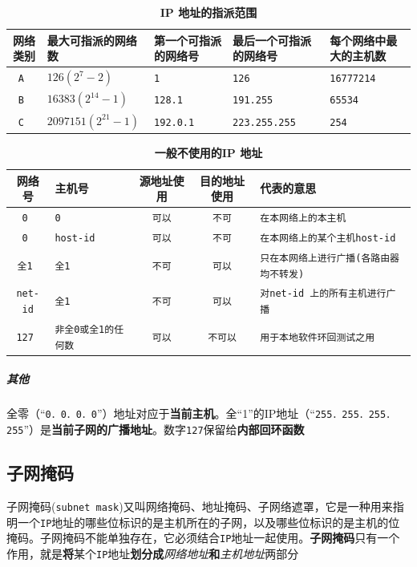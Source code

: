 \documentclass[UTF8,a4paper,8pt]{ctexbook}
\begin{document}
					\begin{table}[H]
						\centering
						\caption{\textbf{IP 地址的指派范围}}
						\begin{tabular}{|c|m{3cm}|m{3cm}|m{3cm}|m{3cm}|}
							\hline 
							网络类别 & 最大可指派的网络数 & 第一个可指派的网络号 & 最后一个可指派的网络号 & 每个网络中最大的主机数\\
							\hline
							\verb|A |&$126(2^7 - 2) $ & \verb|1| & \verb|126| & \verb|16777214|\\
							\verb|B |&$16383(2^{14} - 1) $ & \verb|128.1| & \verb|191.255| & \verb|65534|\\
							\verb|C |&$2097151(2^{21} - 1) $ & \verb|192.0.1| & \verb|223.255.255| & \verb|254|\\
							\hline
						\end{tabular}
					\end{table}
					
					\begin{table}[H]
						\centering
						\caption{\textbf{一般不使用的IP 地址}}
						\begin{tabular}{|c|m{3.1cm}|c|c|m{7cm}|}
							\hline 
							网络号 & 主机号 & 源地址使用 & 目的地址使用 & 代表的意思\\
							\hline
							\verb|0 |&\verb|0 | & \verb|可以| & \verb|不可| & \verb|在本网络上的本主机| \\
							\verb|0 |&\verb|host-id | & \verb|可以| & \verb|不可| & \verb|在本网络上的某个主机host-id| \\
							\verb|全1 |&\verb|全1 | & \verb|不可| & \verb|可以| & \verb|只在本网络上进行广播(各路由器均不转发)| \\
							\verb|net-id|&\verb|全1 | & \verb|不可| & \verb|可以| & \verb|对net-id 上的所有主机进行广播| \\
							\verb|127 |&\verb|非全0或全1的任何数| & \verb|可以| & \verb|不可以| & \verb|用于本地软件环回测试之用| \\
							\hline
						\end{tabular}
					\end{table}
				\subparagraph{其他} 全零（“\verb|0．0．0．0|”）地址对应于\textbf{当前主机}。全“1”的IP地址（“\verb|255．255．255．255|”）是\textbf{当前子网的广播地址}。数字\verb|127|保留给\textbf{内部回环函数}
					
		\subsection{子网掩码}
			子网掩码(\verb|subnet mask|)又叫网络掩码、地址掩码、子网络遮罩，它是一种用来指明一个\verb|IP|地址的哪些位标识的是主机所在的子网，以及哪些位标识的是主机的位掩码。子网掩码不能单独存在，它必须结合\verb|IP|地址一起使用。\textbf{子网掩码}只有一个作用，就是\textbf{将}某个\verb|IP|地址\textbf{划分成}\textit{网络地址}\textbf{和}\textit{主机地址}两部分
				
\end{document}
